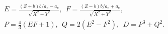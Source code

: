 \documentclass[10pt]{article}
\begin{document}
\begin{align*}&  E = \frac{ \left( Z + b \right) b / a_e - a_e }{ \sqrt{ X^2 + Y^2 } }, 
\ \
F = \frac{ \left( Z - b \right) b / a_e + a_e }{ \sqrt{ X^2 + Y^2 } }, 
\\
&  P = \frac{4}{3} \left( E F + 1  \right), 
\ \
Q = 2 \left( E^2 - F^2 \right), 
\ \
D = P^3 + Q^2 .\end{align*}
\end{document}
